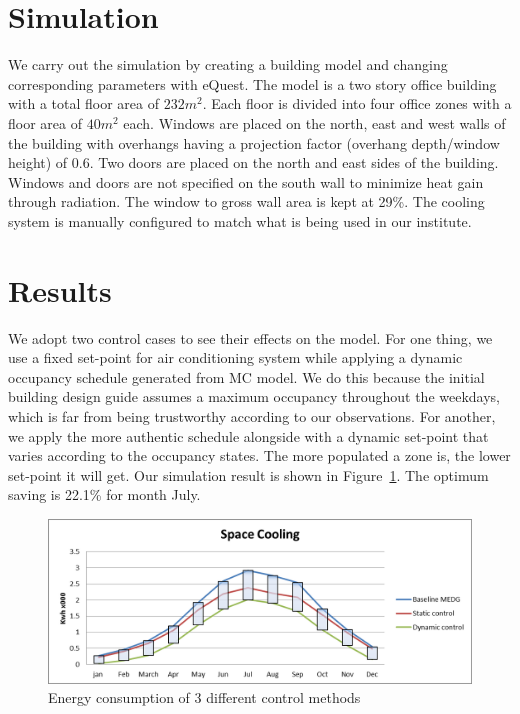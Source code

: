 \documentclass{sig-alternate}
\begin{document}
\section{Simulation}
\label{sec:simulation}

We carry out the simulation by creating a building model and changing corresponding
parameters with eQuest. The model is a two story office building
with a total floor area of $232m^{2}$. Each floor is divided into four
office zones with a floor area of $40m^{2}$ each. Windows are placed on
the north, east and west walls of the building with overhangs having a
projection factor (overhang depth/window height) of $0.6$. Two doors
are placed on the north and east sides of the building. Windows and
doors are not specified on the south wall to minimize heat gain
through radiation. The window to gross wall area is kept at 29\%. The
cooling system is manually configured to match what is being used
in our institute.


\section{Results}
\label{sec:results}
We adopt two control cases to see their effects on the model. For one
thing, we use a fixed set-point for air conditioning system while
applying a dynamic occupancy schedule generated from MC model. We do
this because the initial building design guide assumes a maximum
occupancy throughout the weekdays, which is far from being trustworthy
according to our observations. For another, we apply the more
authentic schedule alongside with a dynamic set-point that varies
according to the occupancy states. The more populated a zone is, the
lower set-point it will get. Our simulation result is shown in
Figure~\ref{fig:energy-consumption}. The optimum saving is 22.1\% for
month July. 

\begin{figure}[!tb]
  \centering
  \includegraphics[scale=0.35]{sc}
  \caption{Energy consumption of 3 different control methods}
  \label{fig:energy-consumption}
\end{figure}
\end{document}
